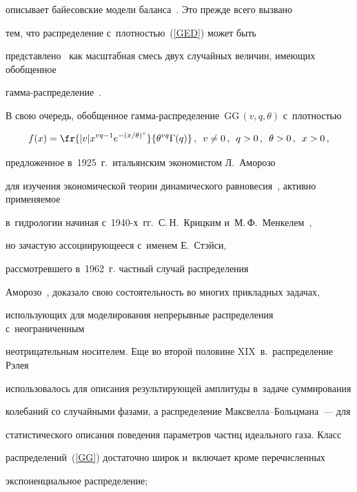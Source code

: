 описывает байесовские модели баланса~\cite{Ku2018}. Это прежде всего вызвано 


тем, что распределение с~плот\-ностью~(\ref{GED}) может быть 


представлено~\cite{Ku2019_2} как масштабная смесь двух случайных величин, имеющих обобщенное 


гам\-ма-рас\-пре\-де\-ление~\cite{Ku2019_2}.





В свою очередь, обобщенное гам\-ма-рас\-пре\-де\-ле\-ние~$\mathrm{GG}\,(v,q,\theta)$ с~плот\-ностью


\begin{equation}


\label{GG}


f(x)=\fr{|v| x^{vq -1}e^{-(x/\theta)^v}}{\theta^{vq}\Gamma(q)}\,,\enskip v\neq0\,,\enskip


q>0\,,\enskip \theta>0\,,\enskip x>0\,,


\end{equation}


предложенное в~1925~г.\ итальянским экономистом Л.~Аморозо


для изучения экономической теории динамического равновесия~\cite{Amoroso1925}, активно применяемое 


в~гидрологии начиная с~1940-х~гг.\ С.\,Н.~Крицким и~М.\,Ф.~Менкелем~\cite{KrMe1946, KrMe1948}, 


но зачастую ассоциирующееся с~именем Е.~Стэйси, 


рас\-смот\-рев\-ше\-го в~1962~г. частный случай распределения 


Аморозо~\cite{Stacy1962}, доказало свою состоятельность во многих прикладных задачах, 


использующих для моделирования непрерывные распределения с~неограниченным 


неотрицательным носителем. Еще во второй половине XIX~в.\ распределение Рэлея 


использовалось для описания результирующей амплитуды в~задаче суммирования 


колебаний со случайными фазами, а распределение Макс\-вел\-ла--Больц\-ма\-на~--- для 


статистического описания поведения параметров частиц идеального газа. Класс 


распределений~(\ref{GG}) достаточно широк и~включает кроме перечисленных


экспоненциальное распределение;


